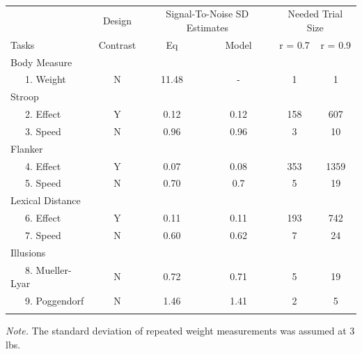 \documentclass[
  ,man]{apa6}
\begin{document}
\begin{table}[tbp]

\begin{center}
\begin{threeparttable}

\caption{\label{tab:allTasks}}

\begin{tabular}{lccccc}
\toprule
 & \multicolumn{1}{c}{Design} & \multicolumn{2}{c}{Signal-To-Noise SD
                        Estimates} & \multicolumn{2}{c}{Needed Trial Size} \\
\cmidrule(r){2-2} \cmidrule(r){3-4} \cmidrule(r){5-6}
Tasks & \multicolumn{1}{c}{Contrast} & \multicolumn{1}{c}{Eq} & \multicolumn{1}{c}{Model} & \multicolumn{1}{c}{r = 0.7} & \multicolumn{1}{c}{r = 0.9}\\
\midrule
Body Measure &  &  &  &  & \\
\ \ \ 1. Weight & N & 11.48 & - & 1 & 1\\
Stroop &  &  &  &  & \\
\ \ \ 2. Effect & Y & 0.12 & 0.12 & 158 & 607\\
\ \ \ 3. Speed & N & 0.96 & 0.96 & 3 & 10\\
Flanker &  &  &  &  & \\
\ \ \ 4. Effect & Y & 0.07 & 0.08 & 353 & 1359\\
\ \ \ 5. Speed & N & 0.70 & 0.7 & 5 & 19\\
Lexical Distance &  &  &  &  & \\
\ \ \ 6. Effect & Y & 0.11 & 0.11 & 193 & 742\\
\ \ \ 7. Speed & N & 0.60 & 0.62 & 7 & 24\\
Illusions &  &  &  &  & \\
\ \ \ 8. Mueller-Lyar & N & 0.72 & 0.71 & 5 & 19\\
\ \ \ 9. Poggendorf & N & 1.46 & 1.41 & 2 & 5\\
\bottomrule
\addlinespace
\end{tabular}

\begin{tablenotes}[para]
\normalsize{\textit{Note.} The standard deviation of repeated weight measurements was assumed at 3 lbs.}
\end{tablenotes}

\end{threeparttable}
\end{center}

\end{table}
\end{document}

